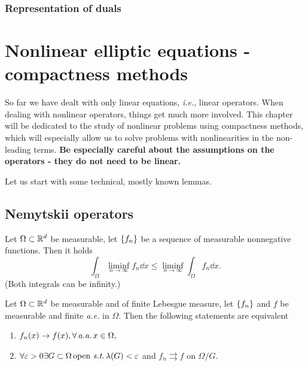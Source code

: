 \documentclass{article}
\begin{document}
\subsubsection{Representation of duals}
\label{sec:dual_representation}

\section{Nonlinear elliptic equations - compactness methods}
\label{sec:nonlinear_elliptic_compact}

So far we have dealt with only linear equations, \textit{i.e.}, linear operators. When dealing with nonlinear operators, things get much more involved. This chapter will be dedicated to the study of nonlinear problems using compactness methods, which will especially allow us to solve problems with nonlinearities in the non-leading terms. \textbf{Be especially careful about the assumptions on the operators - they do not need to be linear.}

Let us start with some technical, mostly known lemmas.

\subsection{Nemytskii operators}
\label{sec:nemytskii_operators}

\begin{lemma}[Fatou]
	Let $\Omega \subset {\mathbb R}^{d}$ be measurable, let $\qty{f_n}$ be a sequence of measurable nonnegative functions. Then it holds
	\[
		\int_{\Omega}\liminf_{n\to \infty}f_n\dd{x} \leq \liminf_{n \to \infty}\int_{\Omega}f_n\dd{x}.
	\]
	(Both integrals can be infinity.)
    
\end{lemma}

\begin{theorem}[Iegorov]
	Let $\Omega \subset {\mathbb R}^{d}$ be measurable and of finite Lebesgue measure, let $\qty{f_n}$ and $f$ be measurable and finite \textit{a.e.} in $\Omega$. Then the following statements are equivalent
\begin{enumerate}
	\item $f_n(x) \to f(x), \forall \, \text{\textit{a.a.}} \,x \in \Omega,$
	\item $\forall \varepsilon >0 \exists G \subset \Omega \, \text{open} \, \, \text{\textit{s.t.}} \, \lambda(G) < \varepsilon$ and $f_n \rightrightarrows f$ on $\Omega / G.$
\end{enumerate}
\end{theorem}
\end{document}

